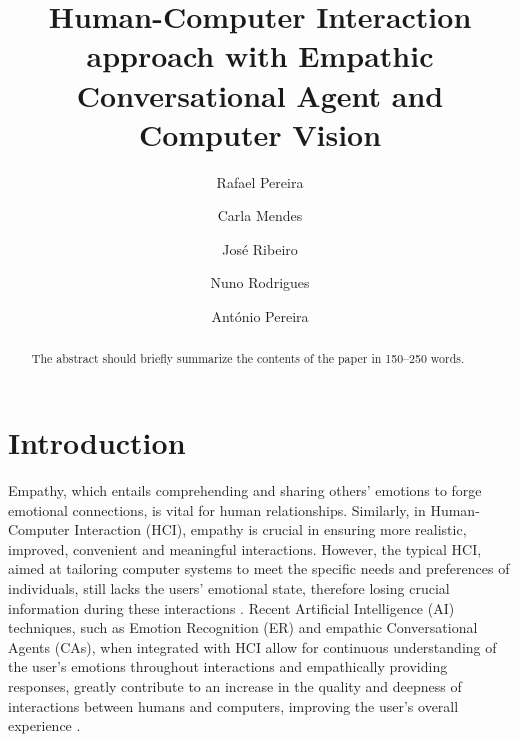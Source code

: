 \documentclass[runningheads]{llncs}
\begin{document}
%
\title{Human-Computer Interaction approach with Empathic Conversational Agent and Computer Vision}
%
%
\author{Rafael Pereira \and
Carla Mendes \and
José Ribeiro \and
Nuno Rodrigues \and
António Pereira}
%
%

%
\maketitle              %
%
\begin{abstract}
The abstract should briefly summarize the contents of the paper in
150--250 words.

\end{abstract}
%
%
%

\section{Introduction}

Empathy, which entails comprehending and sharing others' emotions to forge emotional connections, is vital for human relationships. Similarly, in Human-Computer Interaction (HCI), empathy is crucial in ensuring more realistic, improved, convenient and meaningful interactions. However, the typical HCI, aimed at tailoring computer systems to meet the specific needs and preferences of individuals, still lacks the users' emotional state, therefore losing crucial information during these interactions \cite{jaiswal_facial_2020}.  Recent Artificial Intelligence (AI) techniques, such as Emotion Recognition (ER) and empathic Conversational Agents (CAs), when integrated with HCI allow for continuous understanding of the user's emotions throughout interactions and empathically providing responses, greatly contribute to an increase in the quality and deepness of interactions between humans and computers, improving the user's overall experience \cite{santos_approaches_2018}.
\end{document}
